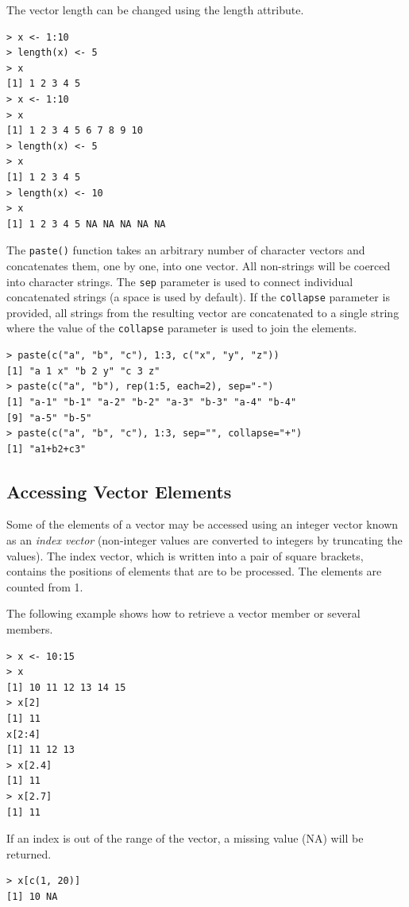 The vector length can be changed using the length attribute.

\begin{verbatim}
> x <- 1:10
> length(x) <- 5
> x
[1] 1 2 3 4 5
> x <- 1:10
> x
[1] 1 2 3 4 5 6 7 8 9 10
> length(x) <- 5
> x
[1] 1 2 3 4 5
> length(x) <- 10
> x
[1] 1 2 3 4 5 NA NA NA NA NA
\end{verbatim}

The \texttt{paste()} function takes an arbitrary number of character vectors and
concatenates them, one by one, into one vector. All non-strings will be coerced 
into character strings. The \texttt{sep} parameter is used to connect individual 
concatenated strings (a space is used by default). If the \texttt{collapse} 
parameter is provided, all strings from the resulting vector are concatenated 
to a single string where the value of the \texttt{collapse} parameter is used 
to join the elements.

\begin{verbatim}
> paste(c("a", "b", "c"), 1:3, c("x", "y", "z"))
[1] "a 1 x" "b 2 y" "c 3 z"
> paste(c("a", "b"), rep(1:5, each=2), sep="-")
[1] "a-1" "b-1" "a-2" "b-2" "a-3" "b-3" "a-4" "b-4"
[9] "a-5" "b-5"
> paste(c("a", "b", "c"), 1:3, sep="", collapse="+")
[1] "a1+b2+c3"
\end{verbatim}

\subsection{Accessing Vector Elements}

Some of the elements of a vector may be accessed using an integer vector known
as an \textit{index vector} (non-integer values are converted to integers by truncating the
values). The index vector, which is written into a pair of square brackets, contains
the positions of elements that are to be processed. The elements are counted
from 1.

The following example shows how to retrieve a vector member or several
members.

\begin{verbatim}
> x <- 10:15
> x
[1] 10 11 12 13 14 15
> x[2]
[1] 11
x[2:4]
[1] 11 12 13
> x[2.4]
[1] 11
> x[2.7]
[1] 11
\end{verbatim}

If an index is out of the range of the vector, a missing value (NA) will be
returned.

\begin{verbatim}
> x[c(1, 20)]
[1] 10 NA
\end{verbatim}

